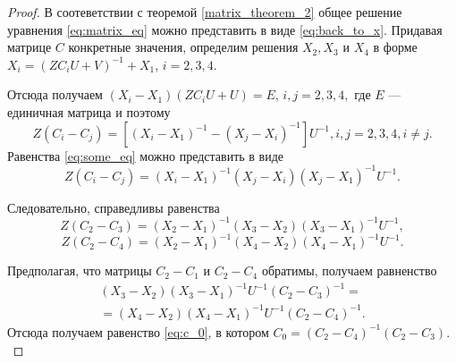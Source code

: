 \begin{proof}
    В соотеветствии с теоремой \eqref{matrix_theorem_2} общее решение уравнения \eqref{eq:matrix_eq} можно представить в виде \eqref{eq:back_to_x}. Придавая матрице $C$ конкретные значения, определим решения $X_2, X_3$ и $X_4$ в форме $X_i = (Z C_i U + V)^{-1} + X_1$, $i = 2, 3, 4.$

    Отсюда получаем $(X_i - X_1)(Z C_i U + U) = E$, $i, j = 2, 3, 4,$ где $E$ --- единичная матрица и поэтому
    \begin{equation} \label{eq:some_eq}
        Z(C_i - C_j) = [(X_i - X_1)^{-1} - (X_j - X_i)^{-1}] U^{-1}, i, j = 2, 3, 4, i \neq j.
    \end{equation}
    Равенства \eqref{eq:some_eq} можно представить в виде
    \begin{equation}
        Z(C_i - C_j) = (X_i - X_1)^{-1}(X_j - X_i)(X_j - X_1)^{-1} U^{-1}.
    \end{equation}

    Следовательно, справедливы равенства
    \begin{equation}
        Z(C_2 - C_3) = (X_2 - X_1)^{-1}(X_3 - X_2)(X_3 - X_1)^{-1} U^{-1},
    \end{equation}
    \begin{equation}
        Z(C_2 - C_4) = (X_2 - X_1)^{-1}(X_4 - X_2)(X_4 - X_1)^{-1} U^{-1}.
    \end{equation}

    Предполагая, что матрицы $C_2 - C_1$ и $C_2 - C_4$ обратимы, получаем равненство
    \begin{multline*}
        (X_3 - X_2)(X_3 - X_1)^{-1} U^{-1}(C_2 - C_3)^{-1} = \\ = (X_4 - X_2)(X_4 - X_1)^{-1} U^{-1} (C_2 - C_4)^{-1}.
    \end{multline*}
    Отсюда получаем равенство \eqref{eq:c_0}, в котором $C_0 = (C_2 - C_4)^{-1} (C_2 - C_3).$
\end{proof}

